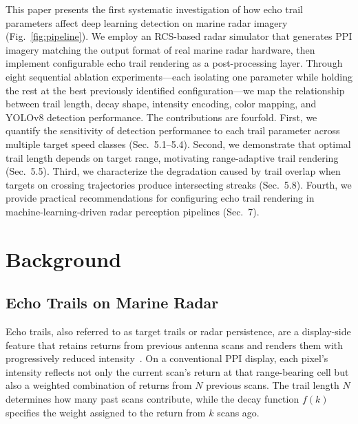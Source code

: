 \documentclass[twocolumn, 10pt]{article}
\begin{document}
This paper presents the first systematic investigation of how echo trail parameters affect deep learning detection on marine radar imagery (Fig.~\ref{fig:pipeline}). We employ an RCS-based radar simulator that generates PPI imagery matching the output format of real marine radar hardware, then implement configurable echo trail rendering as a post-processing layer. Through eight sequential ablation experiments---each isolating one parameter while holding the rest at the best previously identified configuration---we map the relationship between trail length, decay shape, intensity encoding, color mapping, and YOLOv8 detection performance. The contributions are fourfold. First, we quantify the sensitivity of detection performance to each trail parameter across multiple target speed classes (Sec.~5.1--5.4). Second, we demonstrate that optimal trail length depends on target range, motivating range-adaptive trail rendering (Sec.~5.5). Third, we characterize the degradation caused by trail overlap when targets on crossing trajectories produce intersecting streaks (Sec.~5.8). Fourth, we provide practical recommendations for configuring echo trail rendering in machine-learning-driven radar perception pipelines (Sec.~7).


\section{Background}

\subsection{Echo Trails on Marine Radar}

Echo trails, also referred to as target trails or radar persistence, are a display-side feature that retains returns from previous antenna scans and renders them with progressively reduced intensity~\cite{Briggs2004RadarDisplay}. On a conventional PPI display, each pixel's intensity reflects not only the current scan's return at that range-bearing cell but also a weighted combination of returns from $N$ previous scans. The trail length $N$ determines how many past scans contribute, while the decay function $f(k)$ specifies the weight assigned to the return from $k$ scans ago.
\end{document}
